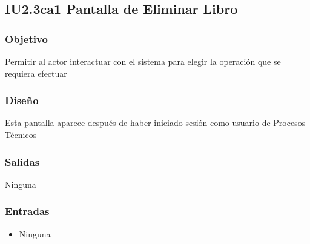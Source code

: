 \newpage
\subsection{IU2.3ca1 Pantalla de Eliminar Libro}

\subsubsection{Objetivo}
	Permitir al actor interactuar con el sistema para elegir la operación que se requiera efectuar

\subsubsection{Diseño}
	Esta pantalla aparece después de haber iniciado sesión como usuario de Procesos Técnicos 


\subsubsection{Salidas}
	\begin{Citemize}
	        \item Ninguna
	\end{Citemize}
	
\subsubsection{Entradas}
		\begin{itemize}
        	\item Ninguna
        \end{itemize}  